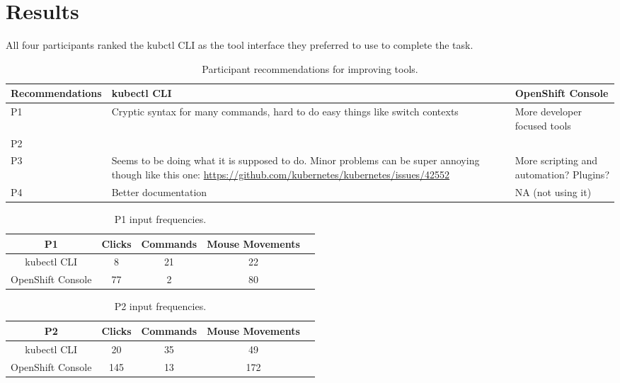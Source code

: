 \documentclass[11pt, oneside]{article}   	%
\begin{document}
\section{Results}

All four participants ranked the kubctl CLI as the tool interface they preferred to use to complete the task. 


\begin{table}
 \centering
  \begin{tabular}{ | m{3cm} | m{6cm} | m{6cm} | } 
  \hline
  Recommendations & kubectl CLI & OpenShift Console \\ 
  \hline
  P1 & Cryptic syntax for many commands, hard to do easy things like switch contexts & More developer focused tools \\ 
  \hline
  P2 & & \\
  \hline
  P3 & Seems to be doing what it is supposed to do. Minor problems can be super annoying though like this one: \url{https://github.com/kubernetes/kubernetes/issues/42552} & More scripting and automation? Plugins? \\
  \hline
  P4 & Better documentation & NA (not using it) \\
  \hline
  \end{tabular}
 \caption{Participant recommendations for improving tools.}
 \label{table:t10}
\end{table}

\begin{table}
 \centering
  \begin{tabular}{ | c | c | c | c | c | }
  \hline
  P1 & Clicks & Commands & Mouse Movements \\ 
  \hline
  kubectl CLI & 8 & 21 & 22 \\ 
  \hline
  OpenShift Console & 77 & 2 & 80 \\ 
  \hline
  \end{tabular}
 \caption{P1 input frequencies.}
 \label{table:t1}
\end{table}

\begin{table}
 \centering
  \begin{tabular}{ | c | c | c | c | c | } 
  \hline
  P2 & Clicks & Commands & Mouse Movements \\ 
  \hline
  kubectl CLI & 20 & 35 & 49 \\ 
  \hline
  OpenShift Console & 145 & 13 & 172 \\ 
  \hline
  \end{tabular}
 \caption{P2 input frequencies.}
 \label{table:t2}
\end{table}
\end{document}
